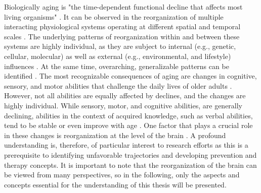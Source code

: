 Biologically aging is "the time-dependent functional decline that affects most living organisms" \cite[p.~1194]{López-Otín2013}. It can be observed in the reorganization of multiple interacting physiological systems operating at different spatial and temporal scales \cite{Mooney2016}. The underlying patterns of reorganization within and between these systems are highly individual, as they are subject to internal (e.g., genetic, cellular, molecular) as well as external (e.g., environmental, and lifestyle) influences \cite{Smith2020, Mooney2016, Cohen2022}. At the same time, overarching, generalizable patterns can be identified \cite{Salthouse2019}. The most recognizable consequences of aging are changes in cognitive, sensory, and motor abilities that challenge the daily lives of older adults \cite{Li2002}. However, not all abilities are equally affected by declines, and the changes are highly individual. While sensory, motor, and cognitive abilities, are generally declining, abilities in the context of acquired knowledge, such as verbal abilities, tend to be stable or even improve with age \cite{Park2009}. One factor that plays a crucial role in these changes is reorganization at the level of the brain \cite{Reuter-Lorenz2010}. A profound understanding is, therefore, of particular interest to research efforts as this is a prerequisite to identifying unfavorable trajectories and developing prevention and therapy concepts. It is important to note that the reorganization of the brain can be viewed from many perspectives, so in the following, only the aspects and concepts essential for the understanding of this thesis will be presented. 

